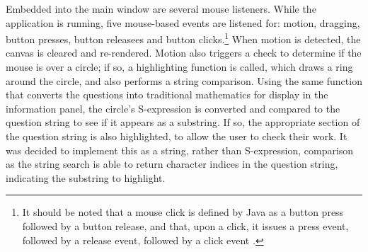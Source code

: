 \documentclass[12pt,twoside,notitlepage,xetex]{report}
\begin{document}
{Embedded into the main window are several mouse listeners.  While the application is running, five mouse-based events are listened for: motion, dragging, button presses, button releasees and button clicks.\footnote{It should be noted that a mouse click is defined by Java as a button press followed by a button release, and that, upon a click, it issues a press event, followed by a release event, followed by a click event \cite{JavaApi}.}  When motion is detected, the canvas is cleared and re-rendered.  Motion also triggers a check to determine if the mouse is over a circle; if so, a highlighting function is called, which draws a ring around the circle, and also performs a string comparison.  Using the same function that converts the questions into traditional mathematics for display in the information panel, the circle's S-expression is converted and compared to the question string to see if it appears as a substring.  If so, the appropriate section of the question string is also highlighted, to allow the user to check their work.  It was decided to implement this as a string, rather than S-expression, comparison as the string search is able to return character indices in the question string, indicating the substring to highlight.

}
\end{document}

